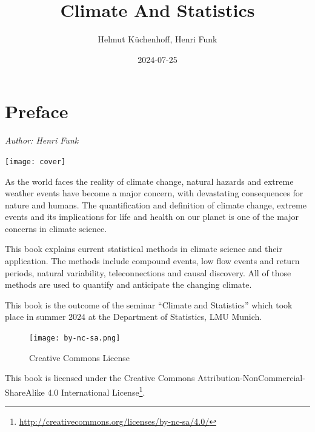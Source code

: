 \documentclass[
]{krantz}
\title{Climate And Statistics}
\author{Helmut Küchenhoff, Henri Funk}
\date{2024-07-25}
\renewcommand{\href}[2]{#2\footnote{\url{#1}}}
\begin{document}
\maketitle


\thispagestyle{empty}

\begin{center}
\end{center}

\setlength{\abovedisplayskip}{-5pt}
\setlength{\abovedisplayshortskip}{-5pt}

{
\hypersetup{linkcolor=}
\setcounter{tocdepth}{0}
\tableofcontents
}
\chapter*{Preface}\label{preface}


\emph{Author: Henri Funk}

\begin{center}\texttt{[image: cover]} \end{center}

As the world faces the reality of climate change, natural hazards and extreme weather events have become a major concern, with devastating consequences for nature and humans. The quantification and definition of climate change, extreme events and its implications for life and health on our planet is one of the major concerns in climate science.

This book explains current statistical methods in climate science and their application.
The methods include compound events, low flow events and return periods, natural variability, teleconnections and causal discovery.
All of those methods are used to quantify and anticipate the changing climate.

This book is the outcome of the seminar ``Climate and Statistics'' which took place in summer 2024 at the Department of Statistics, LMU Munich.

\begin{figure}
\centering
\texttt{[image: by-nc-sa.png]}
\caption{Creative Commons License}
\end{figure}

This book is licensed under the \href{http://creativecommons.org/licenses/by-nc-sa/4.0/}{Creative Commons Attribution-NonCommercial-ShareAlike 4.0 International License}.
\end{document}
